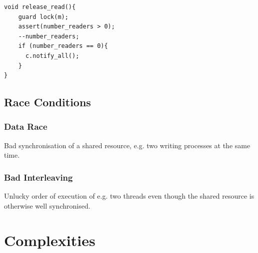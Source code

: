 \documentclass[9pt,landscape,a4paper, table]{extarticle}
\begin{document}
\begin{multicols*}{3}
\begin{verbatim}
void release_read(){
    guard lock(m);
    assert(number_readers > 0);
    --number_readers;
    if (number_readers == 0){
      c.notify_all();
    }
}
\end{verbatim}

\subsection{Race Conditions}
\subsubsection{Data Race}
Bad synchronisation of a shared resource, e.g. two writing processes at the same time.
\subsubsection{Bad Interleaving}
Unlucky order of execution of e.g. two threads even though the shared resource is otherwise well synchronised.

\section{Complexities}

{

}
\end{multicols*}
\end{document}
